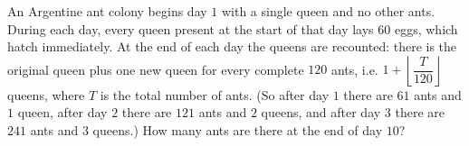 An Argentine ant colony begins day $1$ with a single queen and no other ants. During each day, every queen present at the start of that day lays $60$ eggs, which hatch immediately. At the end of each day the queens are recounted: there is the original queen plus one new queen for every complete $120$ ants, i.e. $1+\left\lfloor\dfrac{T}{120}\right\rfloor$ queens, where $T$ is the total number of ants. (So after day $1$ there are $61$ ants and $1$ queen, after day $2$ there are $121$ ants and $2$ queens, and after day $3$ there are $241$ ants and $3$ queens.) How many ants are there at the end of day $10$?
